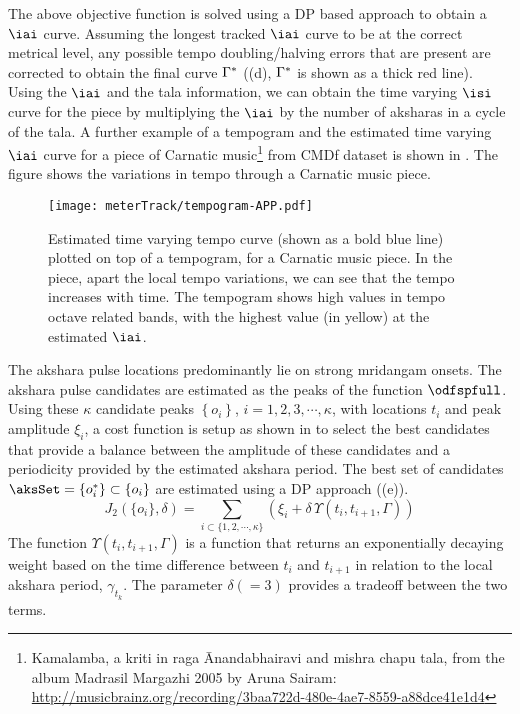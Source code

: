 The above objective function is solved using a \gls{DP} based approach to obtain a $\iai$ curve. Assuming the longest tracked $\iai$ curve to be at the correct metrical level, any possible tempo doubling/halving errors that are present are corrected to obtain the final curve $\Gamma^{\ast}$ ((d), $\Gamma^{\ast}$ is shown as a thick red line). Using the $\iai$ and the \gls{tala} information, we can obtain the time varying $\isi$ curve for the piece by multiplying the $\iai$ by the number of \glspl{akshara} in a cycle of the \gls{tala}. A further example of a tempogram and the estimated time varying $\iai$ curve for a piece of Carnatic music\footnote{Kamalamba, a \gls{kriti} in \gls{raga} Ānandabhairavi and \gls{mishra chapu} \gls{tala}, from the album Madrasil Margazhi 2005 by Aruna Sairam: \url{http://musicbrainz.org/recording/3baa722d-480e-4ae7-8559-a88dce41e1d4}} from \acrshort{CMDf} dataset is shown in . The figure shows the variations in tempo through a Carnatic music piece.
\begin{figure}
\centering
\texttt{[image: meterTrack/tempogram-APP.pdf]}
\caption[Estimated time varying tempo curve with tempogram]{Estimated time varying tempo curve (shown as a bold blue line) plotted on top of a tempogram, for a Carnatic music piece. In the piece, apart the local tempo variations, we can see that the tempo increases with time. The tempogram shows high values in tempo octave related bands, with the highest value (in yellow) at the estimated $\protect\iai$.}\label{fig:tempogram:app}
\end{figure}

The \gls{akshara} pulse locations predominantly lie on strong mridangam onsets. The \gls{akshara} pulse candidates are estimated as the peaks of the function $\odfspfull$. Using these $\kappa$ candidate peaks $\left\{o_i\right\}$, $i=1,2,3,\cdots,\kappa$, with locations $t_{i}$ and peak amplitude $\xi_{i}$, a cost function is setup as shown in  to select the best candidates that provide a balance between the amplitude of these candidates and a periodicity provided by the estimated \gls{akshara} period. The best set of candidates $\aksSet = \left\{o^{\optstar}_i\right\} \subset \left\{o_i\right\}$ are estimated using a \gls{DP} approach ((e)).
\begin{equation}
\label{eqn:AkCandEst:icassp14}
J_{2}\left(\{o_{i}\},\delta\right)=\underset{i\subset \{1,2,\cdots, \kappa\}}{\sum}\left(\xi_{i}+\delta \, \Upsilon(t_{i},t_{i+1},\Gamma)\right)
\end{equation}
The function $\Upsilon(t_{i},t_{i+1},\Gamma)$ is a function that returns an exponentially decaying weight based on the time difference between $t_{i}$ and $t_{i+1}$ in relation to the local \gls{akshara} period, $\gamma_{t_k}$. The parameter $\delta(=3)$ provides a tradeoff between the two terms. 
